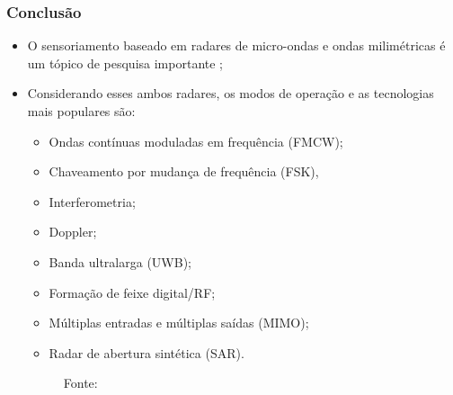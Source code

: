 \documentclass[xcolor=dvipsnames, aspectratio=169]{beamer}
\begin{document}
\begin{frame}
\frametitle{Conclusão}
	\begin{itemize}
		\item O sensoriamento baseado em radares de micro-ondas e ondas milimétricas é um tópico de pesquisa importante \cite{cardillo_2023};
        \item Considerando esses ambos radares, os modos de operação e as tecnologias mais populares são:
        \begin{itemize}
            \item Ondas contínuas moduladas em frequência (FMCW); 
            \item Chaveamento por mudança de frequência (FSK), 
            \item Interferometria; 
            \item Doppler;
            \item Banda ultralarga (UWB); 
            \item Formação de feixe digital/RF;
            \item Múltiplas entradas e múltiplas saídas (MIMO);
            \item Radar de abertura sintética (SAR).
        \end{itemize}

        \begin{figure}
            \centering
            {Fonte: \cite{cardillo_2023}}
            \label{fig:tc_microwave}
        \end{figure}

	\end{itemize}
\end{frame}


\begin{frame}
    \printbibliography
\end{frame}


\begin{frame}
\titlepage %
\end{frame}
\end{document}
